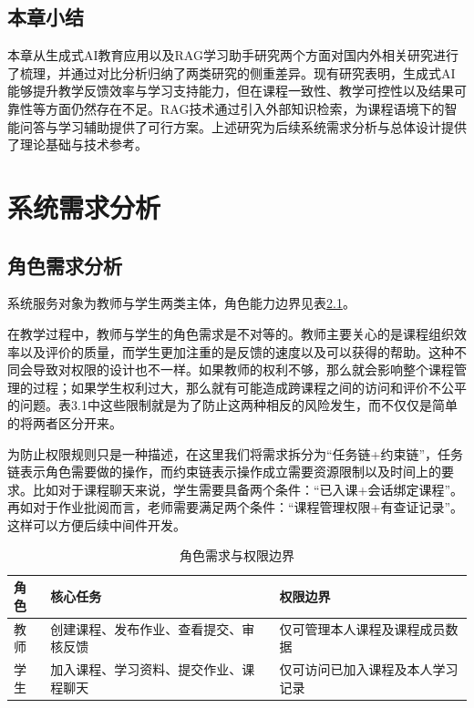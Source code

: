 \documentclass[12pt,a4paper,oneside]{ctexbook}
\numberwithin{equation}{chapter}
\begin{document}
\section{本章小结}

本章从生成式AI教育应用以及RAG学习助手研究两个方面对国内外相关研究进行了梳理，并通过对比分析归纳了两类研究的侧重差异。现有研究表明，生成式AI能够提升教学反馈效率与学习支持能力，但在课程一致性、教学可控性以及结果可靠性等方面仍然存在不足。RAG技术通过引入外部知识检索，为课程语境下的智能问答与学习辅助提供了可行方案。上述研究为后续系统需求分析与总体设计提供了理论基础与技术参考。

\chapter{系统需求分析}

\section{角色需求分析}
系统服务对象为教师与学生两类主体，角色能力边界见表\ref{tab:roleNeeds}。

在教学过程中，教师与学生的角色需求是不对等的。教师主要关心的是课程组织效率以及评价的质量，而学生更加注重的是反馈的速度以及可以获得的帮助。这种不同会导致对权限的设计也不一样。如果教师的权利不够，那么就会影响整个课程管理的过程；如果学生权利过大，那么就有可能造成跨课程之间的访问和评价不公平的问题。表3.1中这些限制就是为了防止这两种相反的风险发生，而不仅仅是简单的将两者区分开来。

为防止权限规则只是一种描述，在这里我们将需求拆分为“任务链+约束链”，任务链表示角色需要做的操作，而约束链表示操作成立需要资源限制以及时间上的要求。比如对于课程聊天来说，学生需要具备两个条件：“已入课+会话绑定课程”。再如对于作业批阅而言，老师需要满足两个条件：“课程管理权限+有查证记录”。这样可以方便后续中间件开发。

\begin{table}[H]
  \centering
  \caption{角色需求与权限边界}
  \label{tab:roleNeeds}
  \begin{tabular}{p{1.5cm}p{5.8cm}p{6.5cm}}
    \toprule
    角色 & 核心任务 & 权限边界 \\
    \midrule
    教师 & 创建课程、发布作业、查看提交、审核反馈 & 仅可管理本人课程及课程成员数据 \\
    学生 & 加入课程、学习资料、提交作业、课程聊天 & 仅可访问已加入课程及本人学习记录 \\
    \bottomrule
  \end{tabular}
\end{table}
\end{document}
